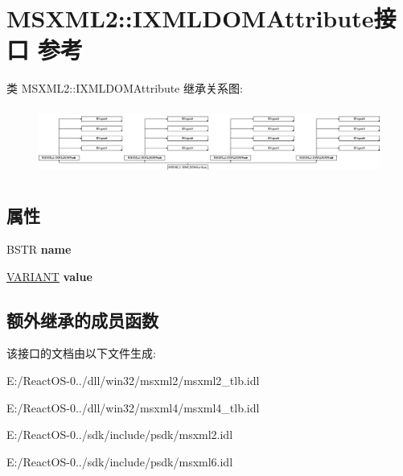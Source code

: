\hypertarget{interface_m_s_x_m_l2_1_1_i_x_m_l_d_o_m_attribute}{}\section{M\+S\+X\+M\+L2\+:\+:I\+X\+M\+L\+D\+O\+M\+Attribute接口 参考}
\label{interface_m_s_x_m_l2_1_1_i_x_m_l_d_o_m_attribute}
类 M\+S\+X\+M\+L2\+:\+:I\+X\+M\+L\+D\+O\+M\+Attribute 继承关系图\+:\begin{figure}[H]
\begin{center}
\leavevmode
\includegraphics[height=2.258065cm]{interface_m_s_x_m_l2_1_1_i_x_m_l_d_o_m_attribute}
\end{center}
\end{figure}
\subsection*{属性}
\begin{DoxyCompactItemize}
\item 
\mbox{\label{interface_m_s_x_m_l2_1_1_i_x_m_l_d_o_m_attribute_aea23be01fc9163566ec8bfc940976b26}} 
B\+S\+TR {\bfseries name}
\item 
\mbox{\label{interface_m_s_x_m_l2_1_1_i_x_m_l_d_o_m_attribute_a375af3d0d9484a10b99f391207574748}} 
\hyperlink{structtag_v_a_r_i_a_n_t}{V\+A\+R\+I\+A\+NT} {\bfseries value}
\end{DoxyCompactItemize}
\subsection*{额外继承的成员函数}


该接口的文档由以下文件生成\+:\begin{DoxyCompactItemize}
\item 
E\+:/\+React\+O\+S-\/0../dll/win32/msxml2/msxml2\+\_\+tlb.\+idl\item 
E\+:/\+React\+O\+S-\/0../dll/win32/msxml4/msxml4\+\_\+tlb.\+idl\item 
E\+:/\+React\+O\+S-\/0../sdk/include/psdk/msxml2.\+idl\item 
E\+:/\+React\+O\+S-\/0../sdk/include/psdk/msxml6.\+idl\end{DoxyCompactItemize}
